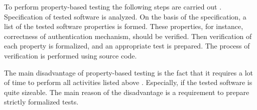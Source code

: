 %
To perform property-based testing the following steps are carried out . 
%
Specification of tested software is analyzed. 
%
On the basis of the specification, a list of the tested software properties is formed. 
%
These properties, for instance, correctness of authentication mechanism, should be verified. 
%
Then verification of each property is formalized, and an appropriate test is prepared. 
%
The process of verification is performed using source code. 

%
The main disadvantage of property-based testing is the fact that it requires a lot of time to perform all activities listed above . 
%
Especially, if the tested software is quite sizeable. 
%
The main reason of the disadvantage is a requirement to prepare strictly formalized tests.